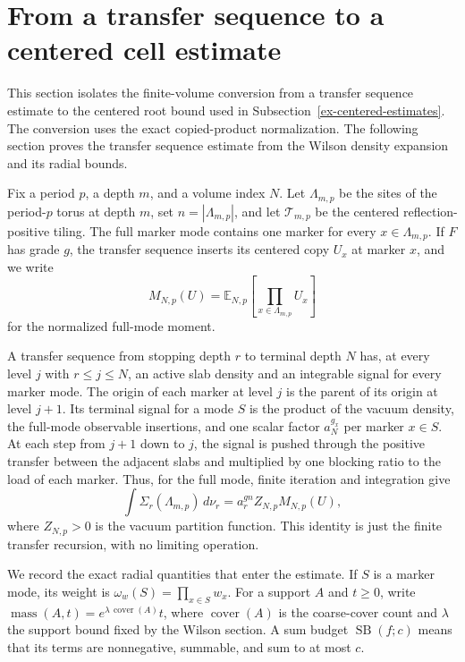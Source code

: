 \section{From a transfer sequence to a centered cell estimate}\label{ex-centered-budget-production}

This section isolates the finite-volume conversion from a transfer sequence estimate to the centered root bound used in Subsection~\ref{ex-centered-estimates}. The conversion uses the exact copied-product normalization. The following section proves the transfer sequence estimate from the Wilson density expansion and its radial bounds.

Fix a period $p$, a depth $m$, and a volume index $N$. Let $\Lambda_{m,p}$ be the sites of the period-$p$ torus at depth $m$, set $n=|\Lambda_{m,p}|$, and let $\mathcal T_{m,p}$ be the centered reflection-positive tiling. The full marker mode contains one marker for every $x\in\Lambda_{m,p}$. If $F$ has grade $g$, the transfer sequence inserts its centered copy $U_x$ at marker $x$, and we write
\[
 M_{N,p}(U)=\mathbb E_{N,p}\!\left[\prod_{x\in\Lambda_{m,p}}U_x\right]
\]
for the normalized full-mode moment.

A transfer sequence from stopping depth $r$ to terminal depth $N$ has, at every level $j$ with $r\leq j\leq N$, an active slab density and an integrable signal for every marker mode. The origin of each marker at level $j$ is the parent of its origin at level $j+1$. Its terminal signal for a mode $S$ is the product of the vacuum density, the full-mode observable insertions, and one scalar factor $a_N^{g_x}$ per marker $x\in S$. At each step from $j+1$ down to $j$, the signal is pushed through the positive transfer between the adjacent slabs and multiplied by one blocking ratio to the load of each marker. Thus, for the full mode, finite iteration and integration give
\[
 \int \Sigma_r(\Lambda_{m,p})\,d\nu_r
 =a_r^{gn} Z_{N,p}M_{N,p}(U),
 \label{ex-centered-lane-transfer}
\]
where $Z_{N,p}>0$ is the vacuum partition function. This identity is just the finite transfer recursion, with no limiting operation.

We record the exact radial quantities that enter the estimate. If $S$ is a marker mode, its weight is $\omega_w(S)=\prod_{x\in S}w_x$. For a support $A$ and $t\geq0$, write $\operatorname{mass}(A,t)=e^{\lambda\,\operatorname{cover}(A)}t$, where $\operatorname{cover}(A)$ is the coarse-cover count and $\lambda$ the support bound fixed by the Wilson section. A sum budget $\operatorname{SB}(f;c)$ means that its terms are nonnegative, summable, and sum to at most $c$.

